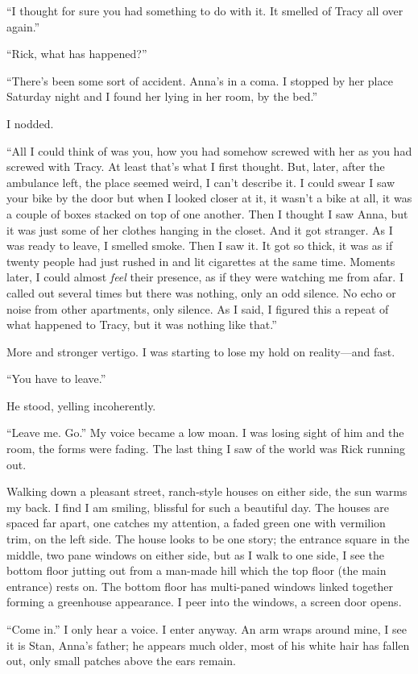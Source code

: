 \documentclass[
]{article}
\begin{document}
``I thought for sure you had something to do with it. It smelled of
Tracy all over again.''

``Rick, what has happened?''

``There's been some sort of accident. Anna's in a coma. I stopped by her
place Saturday night and I found her lying in her room, by the bed.''

I nodded.

``All I could think of was you, how you had somehow screwed with her as
you had screwed with Tracy. At least that's what I first thought. But,
later, after the ambulance left, the place seemed weird, I can't
describe it. I could swear I saw your bike by the door but when I looked
closer at it, it wasn't a bike at all, it was a couple of boxes stacked
on top of one another. Then I thought I saw Anna, but it was just some
of her clothes hanging in the closet. And it got stranger. As I was
ready to leave, I smelled smoke. Then I saw it. It got so thick, it was
as if twenty people had just rushed in and lit cigarettes at the same
time. Moments later, I could almost \emph{feel} their presence, as if
they were watching me from afar. I called out several times but there
was nothing, only an odd silence. No echo or noise from other
apartments, only silence. As I said, I figured this a repeat of what
happened to Tracy, but it was nothing like that.''

More and stronger vertigo. I was starting to lose my hold on
reality---and fast.

``You have to leave.''

He stood, yelling incoherently.

``Leave me. Go.'' My voice became a low moan. I was losing sight of him
and the room, the forms were fading. The last thing I saw of the world
was Rick running out.

Walking down a pleasant street, ranch-style houses on either side, the
sun warms my back. I find I am smiling, blissful for such a beautiful
day. The houses are spaced far apart, one catches my attention, a faded
green one with vermilion trim, on the left side. The house looks to be
one story; the entrance square in the middle, two pane windows on either
side, but as I walk to one side, I see the bottom floor jutting out from
a man-made hill which the top floor (the main entrance) rests on. The
bottom floor has multi-paned windows linked together forming a
greenhouse appearance. I peer into the windows, a screen door opens.

``Come in.'' I only hear a voice. I enter anyway. An arm wraps around
mine, I see it is Stan, Anna's father; he appears much older, most of
his white hair has fallen out, only small patches above the ears remain.
\end{document}
